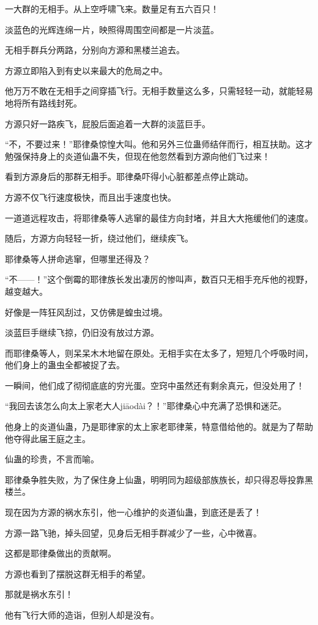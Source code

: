 \begin{this_body}
一大群的无相手。从上空呼啸飞来。数量足有五六百只！

淡蓝色的光辉连绵一片，映照得周围空间都是一片淡蓝。

无相手群兵分两路，分别向方源和黑楼兰追去。

方源立即陷入到有史以来最大的危局之中。

他万万不敢在无相手之间穿插飞行。无相手数量这么多，只需轻轻一动，就能轻易地将所有路线封死。

方源只好一路疾飞，屁股后面追着一大群的淡蓝巨手。

“不，不要过来！”耶律桑惊惶大叫。他和另外三位蛊师结伴而行，相互扶助。这才勉强保持身上的炎道仙蛊不失，但现在他忽然看到方源向他们飞过来！

看到方源身后的那群无相手。耶律桑吓得小心脏都差点停止跳动。

方源不仅飞行速度极快，而且出手速度也快。

一道道远程攻击，将耶律桑等人逃窜的最佳方向封堵，并且大大拖缓他们的速度。

随后，方源方向轻轻一折，绕过他们，继续疾飞。

耶律桑等人拼命逃窜，但哪里还得及？

“不——！”这个倒霉的耶律族长发出凄厉的惨叫声，数百只无相手充斥他的视野，越变越大。

好像是一阵狂风刮过，又仿佛是蝗虫过境。

淡蓝巨手继续飞掠，仍旧没有放过方源。

而耶律桑等人，则呆呆木木地留在原处。无相手实在太多了，短短几个呼吸时间，他们身上的蛊虫全都被捉了去。

一瞬间，他们成了彻彻底底的穷光蛋。空窍中虽然还有剩余真元，但没处用了！

“我回去该怎么向太上家老大人jiāodài？！”耶律桑心中充满了恐惧和迷茫。

他身上的炎道仙蛊，乃是耶律家的太上家老耶律莱，特意借给他的。就是为了帮助他夺得此届王庭之主。

仙蛊的珍贵，不言而喻。

耶律桑争胜失败，为了保住身上仙蛊，明明同为超级部族族长，却只得忍辱投靠黑楼兰。

现在因为方源的祸水东引，他一心维护的炎道仙蛊，到底还是丢了！

方源一路飞驰，掉头回望，见身后无相手群减少了一些，心中微喜。

这都是耶律桑做出的贡献啊。

方源也看到了摆脱这群无相手的希望。

那就是祸水东引！

他有飞行大师的造诣，但别人却是没有。


\end{this_body}
